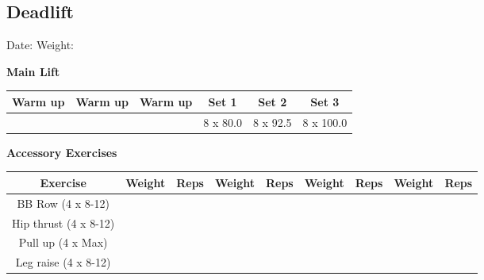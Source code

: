 \documentclass{article}%
\begin{document}
\subsection*{Deadlift}%
Date: %
\linebreak%
Weight: %
\vspace*{20pt}%
\linebreak%
\begin{minipage}{0.5\textwidth}%
\textbf{Main Lift\newline%
\newline%
}%
\begin{tabular}{|c|c|c|c|c|c|}%
\hline%
Warm up&Warm up&Warm up&Set 1&Set 2&Set 3\\%
\hline%
&&&8 x 80.0&8 x 92.5&8 x 100.0\\%
\hline%
\end{tabular}%
\vspace*{20pt}%
\linebreak%
\textbf{Accessory Exercises\newline%
\newline%
}%
\begin{tabular}{|c|c|c|c|c|c|c|c|c|}%
\hline%
Exercise&Weight&Reps&Weight&Reps&Weight&Reps&Weight&Reps\\%
\hline%
BB Row (4 x 8{-}12)&&&&&&&&\\%
\hline%
Hip thrust (4 x 8{-}12)&&&&&&&&\\%
\hline%
Pull up (4 x Max)&&&&&&&&\\%
\hline%
Leg raise (4 x 8{-}12)&&&&&&&&\\%
\hline%
\end{tabular}%
\end{minipage}%
\vspace*{20pt}%
\linebreak

%
\end{document}
